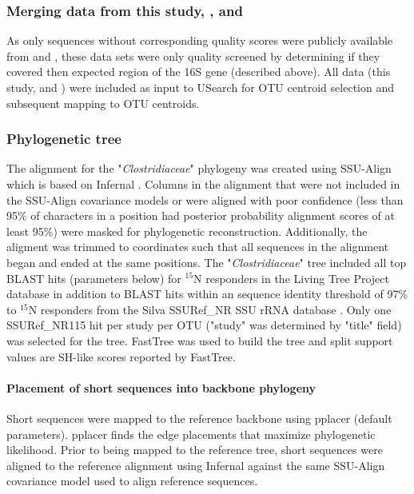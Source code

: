 \subsubsection{Merging data from this study, \citet{Garcia_Pichel_2013}, and \citet{Steven_2013}}
As only sequences without corresponding quality scores were publicly available from \citet{Garcia_Pichel_2013} and \citet{Steven_2013}, these data sets were only quality screened by determining if they covered then expected region of the 16S gene (described above). All data (this study, \citet{Garcia_Pichel_2013} and \citet{Steven_2013}) were included as input to USearch for OTU centroid selection and subsequent mapping to OTU centroids. 

\subsubsection{Phylogenetic tree}
The alignment for the "\textit{Clostridiaceae}" phylogeny was created using SSU-Align which is based on Infernal \cite{24008419, 19307242}. Columns in the alignment that were not included in the SSU-Align covariance models or were aligned with poor confidence (less than 95\% of characters in a position had posterior probability alignment scores of at least 95\%) were masked for phylogenetic reconstruction. Additionally, the aligment was trimmed to coordinates such that all sequences in the alignment began and ended at the same positions. The "\textit{Clostridiaceae}" tree included all top BLAST hits (parameters below) for $^{15}$N responders in the Living Tree Project database \cite{Yarza_2008} in addition to BLAST hits within an sequence identity threshold of 97\% to $^{15}$N responders from the Silva SSURef\_NR SSU rRNA database \cite{17947321}. Only one SSURef\_NR115 hit per study per OTU ("study" was determined by "title" field) was selected for the tree. FastTree \cite{20224823} was used to build the tree and split support values are SH-like scores reported by FastTree.

\paragraph{Placement of short sequences into backbone phylogeny}
Short sequences were mapped to the reference backbone using pplacer \cite{Matsen_2010} (default parameters). pplacer finds the edge placements that maximize phylogenetic likelihood. Prior to being mapped to the reference tree, short sequences were aligned to the reference alignment using Infernal \cite{19307242} against the same SSU-Align covariance model used to align reference sequences.


